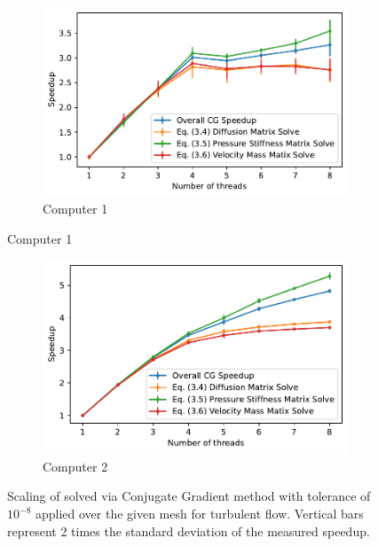 \begin{figure}[H]
  \centering
  \begin{subfigure}[b]{0.8\textwidth}
      \centering
      \includegraphics[width=\textwidth]{Figures/TurbulentCGSpeedUpC1.pdf}
      \caption{Computer 1}
  \end{subfigure}
\end{figure}
\begin{figure}[H]
	\centering
  \ContinuedFloat
  \begin{subfigure}[b]{0.8\textwidth}
      \centering
      \includegraphics[width=\textwidth]{Figures/TurbulentCGSpeedUpC2.pdf}
      \caption{Computer 2}
  \end{subfigure}\caption{Scaling of  solved via Conjugate Gradient method with tolerance of $10^{-8}$ applied over the given mesh for turbulent flow. Vertical bars represent 2 times the standard deviation of the measured speedup.}
  \label{fig:turbulent-scaling}
\end{figure}

